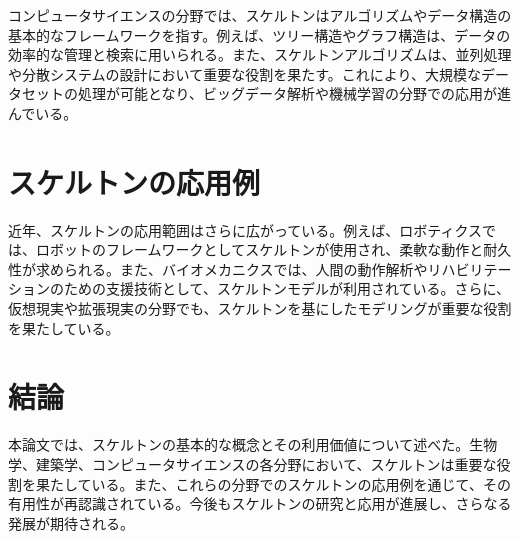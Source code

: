\documentclass[lualatex, article]{jlreq}
\begin{document}
コンピュータサイエンスの分野では、スケルトンはアルゴリズムやデータ構造の基本的なフレームワークを指す。例えば、ツリー構造やグラフ構造は、データの効率的な管理と検索に用いられる。また、スケルトンアルゴリズムは、並列処理や分散システムの設計において重要な役割を果たす。これにより、大規模なデータセットの処理が可能となり、ビッグデータ解析や機械学習の分野での応用が進んでいる。

\section{スケルトンの応用例}

近年、スケルトンの応用範囲はさらに広がっている。例えば、ロボティクスでは、ロボットのフレームワークとしてスケルトンが使用され、柔軟な動作と耐久性が求められる。また、バイオメカニクスでは、人間の動作解析やリハビリテーションのための支援技術として、スケルトンモデルが利用されている。さらに、仮想現実や拡張現実の分野でも、スケルトンを基にしたモデリングが重要な役割を果たしている。

\section{結論}

本論文では、スケルトンの基本的な概念とその利用価値について述べた。生物学、建築学、コンピュータサイエンスの各分野において、スケルトンは重要な役割を果たしている。また、これらの分野でのスケルトンの応用例を通じて、その有用性が再認識されている。今後もスケルトンの研究と応用が進展し、さらなる発展が期待される。

\printbibliography[title=引用文献]{}
\end{document}
